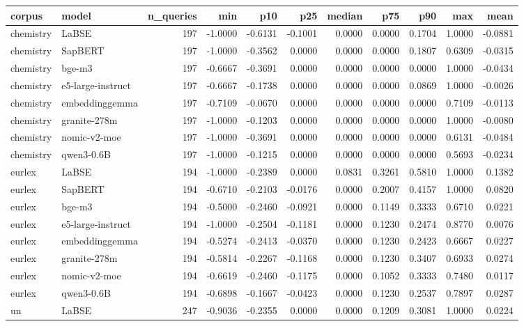 \begin{tabular}{llrrrrrrrrr}
\toprule
corpus & model & n\_queries & min & p10 & p25 & median & p75 & p90 & max & mean \\
\midrule
chemistry & LaBSE & 197 & -1.0000 & -0.6131 & -0.1001 & 0.0000 & 0.0000 & 0.1704 & 1.0000 & -0.0881 \\
chemistry & SapBERT & 197 & -1.0000 & -0.3562 & 0.0000 & 0.0000 & 0.0000 & 0.1807 & 0.6309 & -0.0315 \\
chemistry & bge-m3 & 197 & -0.6667 & -0.3691 & 0.0000 & 0.0000 & 0.0000 & 0.0000 & 1.0000 & -0.0434 \\
chemistry & e5-large-instruct & 197 & -0.6667 & -0.1738 & 0.0000 & 0.0000 & 0.0000 & 0.0869 & 1.0000 & -0.0026 \\
chemistry & embeddinggemma & 197 & -0.7109 & -0.0670 & 0.0000 & 0.0000 & 0.0000 & 0.0000 & 0.7109 & -0.0113 \\
chemistry & granite-278m & 197 & -1.0000 & -0.1203 & 0.0000 & 0.0000 & 0.0000 & 0.0000 & 1.0000 & -0.0080 \\
chemistry & nomic-v2-moe & 197 & -1.0000 & -0.3691 & 0.0000 & 0.0000 & 0.0000 & 0.0000 & 0.6131 & -0.0484 \\
chemistry & qwen3-0.6B & 197 & -1.0000 & -0.1215 & 0.0000 & 0.0000 & 0.0000 & 0.0000 & 0.5693 & -0.0234 \\
eurlex & LaBSE & 194 & -1.0000 & -0.2389 & 0.0000 & 0.0831 & 0.3261 & 0.5810 & 1.0000 & 0.1382 \\
eurlex & SapBERT & 194 & -0.6710 & -0.2103 & -0.0176 & 0.0000 & 0.2007 & 0.4157 & 1.0000 & 0.0820 \\
eurlex & bge-m3 & 194 & -0.5000 & -0.2460 & -0.0921 & 0.0000 & 0.1149 & 0.3333 & 0.6710 & 0.0221 \\
eurlex & e5-large-instruct & 194 & -1.0000 & -0.2504 & -0.1181 & 0.0000 & 0.1230 & 0.2474 & 0.8770 & 0.0076 \\
eurlex & embeddinggemma & 194 & -0.5274 & -0.2413 & -0.0370 & 0.0000 & 0.1230 & 0.2423 & 0.6667 & 0.0227 \\
eurlex & granite-278m & 194 & -0.5814 & -0.2267 & -0.1168 & 0.0000 & 0.1230 & 0.3407 & 0.6933 & 0.0274 \\
eurlex & nomic-v2-moe & 194 & -0.6619 & -0.2460 & -0.1175 & 0.0000 & 0.1052 & 0.3333 & 0.7480 & 0.0117 \\
eurlex & qwen3-0.6B & 194 & -0.6898 & -0.1667 & -0.0423 & 0.0000 & 0.1230 & 0.2537 & 0.7897 & 0.0287 \\
un & LaBSE & 247 & -0.9036 & -0.2355 & 0.0000 & 0.0000 & 0.1209 & 0.3081 & 1.0000 & 0.0224 \\

\end{tabular}
